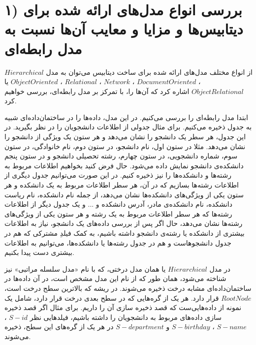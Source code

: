 
\section*{\centering ۱) بررسی انواع مدل‌های ارائه شده برای دیتابیس‌ها و مزایا و معایب آن‌ها نسبت به مدل رابطه‌ای
}



‌از انواع مختلف مدل‌های ارائه شده برای ساخت دیتابیس می‌توان به مدل 
$Hierarchical$
،
$Document Oriented$
،‌
$Network$
،
$Relational$
،
$Object Oriented $
یا
$Object Relational$
اشاره کرد که آن‌ها را، با تمرکز بر مدل رابطه‌ای، بررسی خواهیم کرد.

ابتدا مدل رابطه‌ای را بررسی می‌کنیم. در این مدل، داده‌ها را در ساختمان‌داده‌ای شبیه به جدول ذخیره می‌کنیم.
برای مثال جدولی از اطلاعات دانشجویان را در نظر بگیرید. در این جدول، هر سطر یک دانشجو را نشان می‌دهد و هر ستون یک ویژگی از دانشجو را نشان می‌دهد. مثلا در ستون اول، نام دانشجو، در ستون دوم، نام خانوادگی، در ستون سوم، شماره دانشجویی، در ستون چهارم، رشته تحصیلی دانشجو
و در ستون پنجم دانشکده‌ی دانشجو نمایش داده می‌شود.
حال فرض کنید بخواهیم اطلاعات مربوط به رشته‌ها و دانشکده‌ها را نیز ذخیره کنیم.
در این صورت می‌توانیم جدول دیگری از اطلاعات رشته‌ها بسازیم که در آن، هر سطر اطلاعات مربوط به یک دانشکده و هر ستون یکی از ویژگی‌های دانشکده‌ها نشان می‌دهد،
 از جمله نام دانشکده، نام ریاست دانشکده، نام دانشکده‌ی مادر، آدرس دانشکده و ...
و یک جدول دیگر از اطلاعات رشته‌ها که هر سطر اطلاعات مربوط به یک رشته و هر ستون یکی از ویژگی‌های رشته‌ها نشان می‌دهد،
حال اگر پس از بررسی داده‌های یک دانشجو، نیاز به اطلاعات بیشتری از دانشکده یا رشته‌ی دانشجو داشته باشیم، به کمک فیلدِ مشترکی که هم در جدول دانشجوهاست و هم در جدول رشته‌ها یا دانشکده‌ها، می‌توانیم به اطلاعات بیشتری دست پیدا بکنیم.


در مدل 
$Hierarchical$
یا همان مدل درختی، که با نام «مدل سلسله مراتبی» نیز شناخته می‌شود،  همان طور که از نام این مدل مشخص است، در آن داده‌ها در ساختمان‌داده‌ای مشابه  درخت ذخیره می‌شوند.
در ریشه که بالاترین سطح درخت است، 
$Root Node$
قرار دارد.
هر یک از گره‌هایی که در سطح بعدی درخت قرار دارد، شامل یک نمونه از داده‌هایی‌ست که قصد ذخیره سازی آن را داریم.
برای مثال اگر قصد ذخیره سازی داده‌های مربوط به دانشجویان را داشته باشیم، فیلدهایی نظر 
$S-id$
،‌
$S-name$
،
$S-birthday$
و
$S-department$
در هر یک از گره‌های این سطح، ذخیره می‌شوند.

